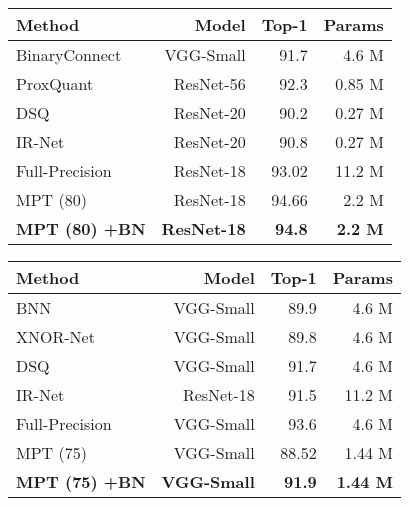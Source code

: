 \documentclass{article} \usepackage{iclr2021_conference,times}
\begin{document}
\begin{table*}[h] 
\parbox{.45\linewidth}{
\centering
\begin{small}
\begin{tabular}{@{}lrrr@{}}\toprule
\textbf{Method} & \textbf{Model} & \textbf{Top-1} & \textbf{Params} \\ \midrule
BinaryConnect & VGG-Small & 91.7 & 4.6 M \\ \hdashline
ProxQuant & ResNet-56 & 92.3 & 0.85 M \\ \hdashline
DSQ & ResNet-20 & 90.2 & 0.27 M \\ \hdashline
IR-Net & ResNet-20 & 90.8 & 0.27 M \\ \hdashline
Full-Precision & ResNet-18 & 93.02 & 11.2 M \\ \hline
MPT (80) & ResNet-18 & 94.66 & 2.2 M \\ \hdashline
\textbf{MPT (80) +BN} & \textbf{ResNet-18} & \textbf{94.8} & \textbf{2.2 M} \\ 
\bottomrule
\end{tabular}
\end{small}
\vspace{-0.1in}
\caption{Comparison of MPT-1/32 with trained binary-1/32 networks on CIFAR-10.}
\label{table:cifar-mpt-1-32}
}
\hspace{.055\linewidth}
\parbox{.45\linewidth}{
\centering
\begin{small}
\begin{tabular}{@{}lrrr@{}}\toprule
\textbf{Method} & \textbf{Model} & \textbf{Top-1} & \textbf{Params} \\ \midrule
BNN & VGG-Small & 89.9 & 4.6 M \\ \hdashline
XNOR-Net & VGG-Small & 89.8 & 4.6 M \\ \hdashline
DSQ & VGG-Small & 91.7 & 4.6 M \\ \hdashline
IR-Net & ResNet-18 & 91.5 & 11.2 M \\
{Full-Precision} & VGG-Small & 93.6 & 4.6 M \\ \hline
MPT (75) & VGG-Small & 88.52 & 1.44 M \\ \hdashline
\textbf{MPT (75) +BN} & \textbf{VGG-Small} & \textbf{91.9} & \textbf{1.44 M} \\
\bottomrule
\end{tabular}
\end{small}
\vspace{-0.1in}
\caption{Comparison of MPT-1/1 with trained binary-1/1 networks on CIFAR-10.}
\label{table:cifar-mpt-1-1}
}
\end{table*} 
\vspace*{-0.5mm}
\end{document}
